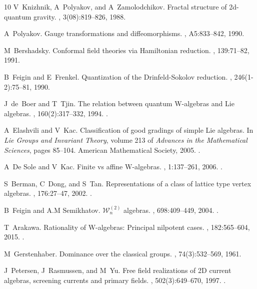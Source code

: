 \documentclass[10pt,a4paper]{amsart}
\numberwithin{equation}{section}
\theoremstyle{plain}
\begin{document}
\begin{thebibliography}{10}
V~Knizhnik, A~Polyakov, and A~Zamolodchikov.
\newblock Fractal structure of 2d-quantum gravity.
, 3(08):819--826, 1988.

A~Polyakov.
\newblock Gauge transformations and diffeomorphisms.
, A5:833--842, 1990.

M~Bershadsky.
\newblock Conformal field theories via {Hamiltonian} reduction.
, 139:71--82, 1991.

B~Feigin and E~Frenkel.
\newblock Quantization of the {D}rinfeld-{S}okolov reduction.
, 246(1-2):75--81, 1990.

J~de~Boer and T~Tjin.
\newblock The relation between quantum {W}-algebras and {L}ie algebras.
, 160(2):317--332, 1994.
\newblock {}.

A~Elashvili and V~Kac.
\newblock Classification of good gradings of simple {Lie} algebras.
\newblock In {\em Lie Groups and Invariant Theory}, volume 213 of {\em Advances
  in the Mathematical Sciences}, pages 85--104. American Mathematical Society,
  2005.
\newblock {}.

A~{D}e Sole and V~Kac.
\newblock Finite vs affine {W}-algebras.
, 1:137--261, 2006.
\newblock {}.

S~Berman, C~Dong, and S~Tan.
\newblock Representations of a class of lattice type vertex algebras.
, 176:27--47, 2002.
\newblock {}.

B~Feigin and A.M Semikhatov.
\newblock $\mathcal{W}_n^{(2)}$ algebras.
, 698:409--449, 2004.
\newblock {}.

T~Arakawa.
\newblock Rationality of {W}-algebras: Principal nilpotent cases.
, 182:565--604, 2015.
\newblock {}.

M~Gerstenhaber.
\newblock Dominance over the classical groups.
, 74(3):532--569, 1961.

J~Petersen, J~Rasmussen, and M~Yu.
\newblock Free field realizations of 2{D} current algebras, screening currents
  and primary fields.
, 502(3):649--670, 1997.
\newblock {}.


\end{thebibliography}
\end{document}
